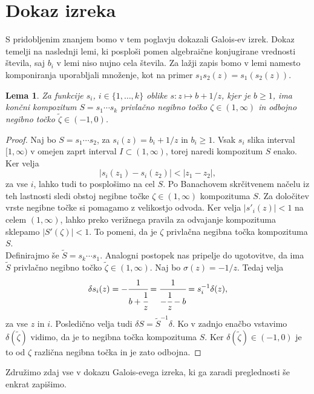 \documentclass[a4paper,12pt]{article}
\newtheorem{lema}{Lema}
\newenvironment{dokaz}[1][Dokaz]{\begin{proof}}{\end{proof}}
\begin{document}

\section{Dokaz izreka}

S pridobljenim znanjem bomo v tem poglavju dokazali Galois-ev izrek. Dokaz temelji na naslednji lemi, ki posploši pomen algebraične konjugirane vrednosti števila, saj $b_i$ v lemi niso nujno cela števila. Za lažji zapis bomo v lemi namesto komponiranja uporabljali množenje, kot na primer $s_1s_2(z) = s_1(s_2(z))$.

\begin{lema}
    Za funkcije $s_i$, $i \in \{1, \ldots, k\}$ oblike $s : z \mapsto b + 1/z$, kjer je $b \geq 1$, ima končni kompozitum $S = s_1 \cdots s_k$ privlačno negibno točko $\zeta \in (1, \infty)$ in odbojno negibno točko $\tilde{\zeta} \in (-1, 0)$. 
\end{lema}
\begin{dokaz}
    Naj bo $S = s_1 \cdots s_2$, za $s_i(z) = b_i + 1/z$ in $b_i \geq 1$. Vsak $s_i$ slika interval $[1, \infty)$ v omejen zaprt interval $I \subset (1, \infty)$, torej naredi kompozitum $S$ enako. Ker velja
    \[
        |s_i(z_1) - s_i(z_2)| < |z_1 - z_2|,
    \]
    za vse $i$, lahko tudi to posplošimo na cel $S$. Po Banachovem skrčitvenem načelu iz teh lastnosti sledi obstoj negibne točke $\zeta \in (1, \infty)$ kompozituma $S$. Za določitev vrste negibne točke si pomagamo z velikostjo odvoda. Ker velja $|s'_i(z)| < 1$ na celem $(1, \infty)$, lahko preko verižnega pravila za odvajanje kompozituma sklepamo $|S'(\zeta)| < 1$. To pomeni, da je $\zeta$ privlačna negibna točka kompozituma $S$.\\
    Definirajmo še $\tilde{S} = s_k \cdots s_1$. Analogni postopek nas pripelje do ugotovitve, da ima $\tilde{S}$ privlačno negibno točko $\tilde{\zeta} \in (1, \infty)$. Naj bo $\sigma(z) = -1/z$. Tedaj velja
    \[
        \delta s_i (z) = - \cfrac{1}{b + \cfrac{1}{z}} = \cfrac{1}{-\cfrac{1}{z} - b} = s^{-1}_i \delta (z),
    \]
    za vse $z$ in $i$. Posledično velja tudi $\delta S = \tilde{S}^{-1} \delta$. Ko v zadnjo enačbo vstavimo $\delta (\tilde{\zeta})$ vidimo, da je to negibna točka kompozituma $S$. Ker $\delta (\tilde{\zeta}) \in (-1, 0)$ je to od $\zeta$ različna negibna točka in je zato odbojna.
\end{dokaz}

Združimo zdaj vse v dokazu Galois-evega izreka, ki ga zaradi preglednosti še enkrat zapišimo.
\end{document}
